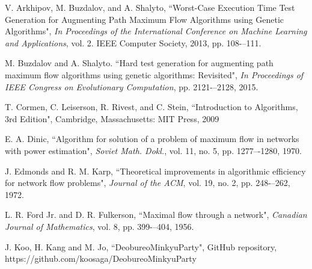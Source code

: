 \documentclass[a4paper, 10pt, conference]{ieeeconf}      %
\begin{document}





\begin{thebibliography}{99}

 V. Arkhipov, M. Buzdalov, and A. Shalyto, ``Worst-Case Execution Time Test Generation for Augmenting Path Maximum Flow Algorithms using Genetic Algorithms", \textit{In Proceedings of the International Conference on Machine Learning and Applications}, vol. 2. IEEE Computer Society, 2013, pp. 108-–111.

 M. Buzdalov and A. Shalyto. ``Hard test generation for augmenting path maximum flow algorithms using genetic algorithms: Revisited", \textit{In Proceedings of IEEE Congress on Evolutionary Computation}, pp. 2121-–2128, 2015.

 T. Cormen, C. Leiserson, R. Rivest, and C. Stein, ``Introduction to Algorithms, 3rd Edition", Cambridge, Massachusetts: MIT Press, 2009

 E. A. Dinic, ``Algorithm for solution of a problem of maximum flow in networks with power estimation", \textit{Soviet Math. Dokl.}, vol. 11, no. 5, pp. 1277–-1280, 1970.

 J. Edmonds and R. M. Karp, ``Theoretical improvements in algorithmic efficiency for network flow problems", \textit{Journal of the ACM}, vol. 19, no. 2, pp. 248-–262, 1972.

 L. R. Ford Jr. and D. R. Fulkerson, ``Maximal flow through a network",
\textit{Canadian Journal of Mathematics}, vol. 8, pp. 399-–404, 1956.

 J. Koo, H. Kang and M. Jo, ``DeobureoMinkyuParty", GitHub repository, https://github.com/koosaga/DeobureoMinkyuParty

\end{thebibliography}
\end{document}
